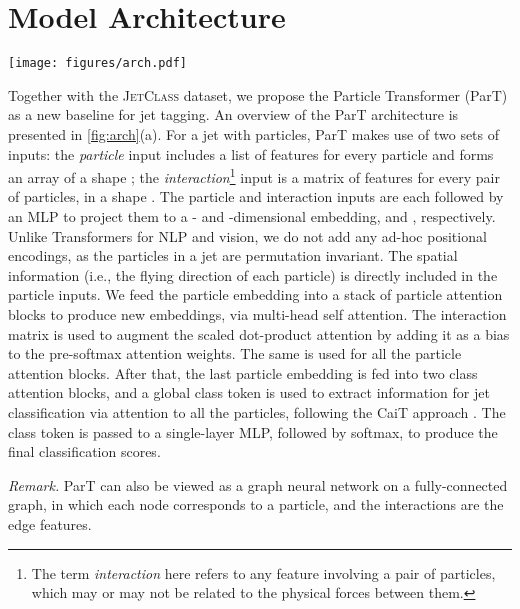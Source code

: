 \documentclass[nohyperref]{article}
\theoremstyle{plain}
\theoremstyle{definition}
\theoremstyle{remark}
\newcommand{\jetclass}{{\textsc{JetClass}}\xspace}
\begin{document}
\section{Model Architecture}
\label{sec:arch}

\begin{figure*}[t]
\begin{center}
\centerline{\texttt{[image: figures/arch.pdf]}}
\vskip -0.2in
\caption{The architecture of (a) Particle Transformer (b) Particle Attention Block (c) Class Attention Block.}
\label{fig:arch}
\end{center}
\vskip -0.4in
\end{figure*}

Together with the \jetclass dataset, we propose the Particle Transformer (ParT) as a new baseline for jet tagging. An overview of the ParT architecture is presented in \cref{fig:arch}(a). For a jet with  particles, ParT makes use of two sets of inputs: the \textit{particle} input includes a list of  features for every particle and forms an array of a shape ; the \textit{interaction}\footnote{The term \textit{interaction} here refers to any feature involving a pair of particles, which may or may not be related to the physical forces between them.} input is a matrix of  features for every pair of particles, in a shape . The particle and interaction inputs are each followed by an MLP to project them to a - and -dimensional embedding,  and , respectively. Unlike Transformers for NLP and vision, we do not add any ad-hoc positional encodings, as the particles in a jet are permutation invariant. The spatial information (i.e., the flying direction of each particle) is directly included in the particle inputs. 
We feed the particle embedding  into a stack of  particle attention blocks to produce new embeddings,  via multi-head self attention. The interaction matrix  is used to augment the scaled dot-product attention by adding it as a bias to the pre-softmax attention weights. The same  is used for all the particle attention blocks. After that, the last particle embedding  is fed into two class attention blocks, and a global class token  is used to extract information for jet classification via attention to all the particles, following the CaiT approach \cite{Touvron_2021_ICCV}. The class token is passed to a single-layer MLP, followed by softmax, to produce the final classification scores. 

\textit{Remark.} ParT can also be viewed as a graph neural network on a fully-connected graph, in which each node corresponds to a particle, and the interactions are the edge features.
\end{document}
